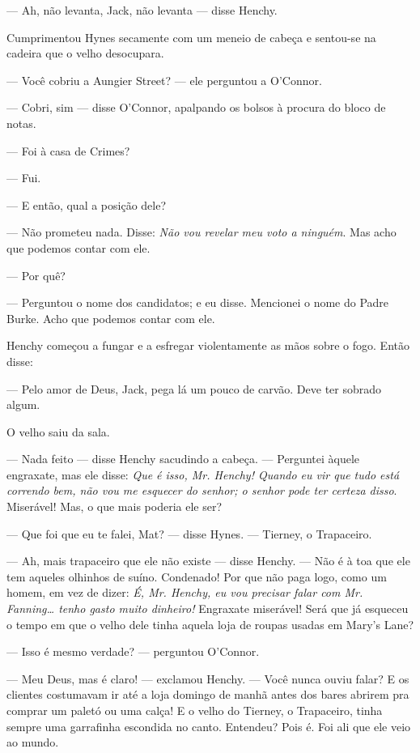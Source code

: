 --- Ah, não levanta, Jack, não levanta --- disse Henchy.

Cumprimentou Hynes secamente com um meneio de cabeça e sentou-se na
cadeira que o velho desocupara.

--- Você cobriu a Aungier Street? --- ele perguntou a O'Connor.

--- Cobri, sim --- disse O'Connor, apalpando os bolsos à procura do
bloco de notas.

--- Foi à casa de Crimes?

--- Fui.

--- E então, qual a posição dele?

--- Não prometeu nada. Disse: \textit{Não vou revelar meu voto a
ninguém}. Mas acho que podemos contar com ele.

--- Por quê?

--- Perguntou o nome dos candidatos; e eu disse. Mencionei o nome do
Padre Burke. Acho que podemos contar com ele.

Henchy começou a fungar e a esfregar violentamente as mãos sobre o
fogo. Então disse:

--- Pelo amor de Deus, Jack, pega lá um pouco de carvão. Deve ter
sobrado algum.

O velho saiu da sala.

--- Nada feito --- disse Henchy sacudindo a cabeça. --- Perguntei
àquele engraxate, mas ele disse: \textit{Que é isso, Mr. Henchy! Quando eu
vir que tudo está correndo bem, não vou me esquecer do senhor; o
senhor pode ter certeza disso}. Miserável! Mas, o que mais poderia ele
ser?

--- Que foi que eu te falei, Mat? --- disse Hynes. --- Tierney, o
Trapaceiro.

--- Ah, mais trapaceiro que ele não existe --- disse Henchy. --- Não é
à toa que ele tem aqueles olhinhos de suíno. Condenado! Por que não
paga logo, como um homem, em vez de dizer: \textit{É, Mr. Henchy, eu vou
precisar falar com Mr. Fanning\ldots{} tenho gasto muito dinheiro!}
Engraxate miserável! Será que já esqueceu o tempo em que o velho dele
tinha aquela loja de roupas usadas em Mary's Lane?

--- Isso é mesmo verdade? --- perguntou O'Connor.

--- Meu Deus, mas é claro! --- exclamou Henchy. --- Você nunca ouviu
falar? E os clientes costumavam ir até a loja domingo de manhã antes
dos bares abrirem pra comprar um paletó ou uma calça! E o velho do
Tierney, o Trapaceiro, tinha sempre uma garrafinha escondida no canto.
Entendeu? Pois é. Foi ali que ele veio ao mundo.

